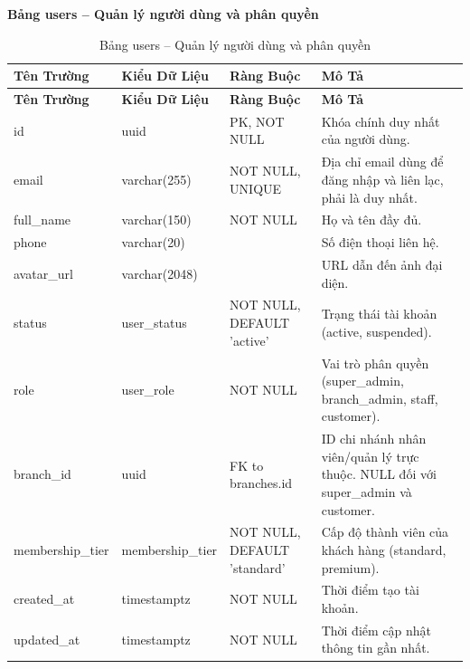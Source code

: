 \textbf{Bảng users -- Quản lý người dùng và phân quyền}
\label{table:users}
\begin{longtable}{|p{3cm}|p{2.5cm}|p{3.5cm}|p{5cm}|}
\caption{Bảng users -- Quản lý người dùng và phân quyền} \\
\hline
\textbf{Tên Trường} & \textbf{Kiểu Dữ Liệu} & \textbf{Ràng Buộc} & \textbf{Mô Tả} \\
\hline
\endfirsthead
\hline
\textbf{Tên Trường} & \textbf{Kiểu Dữ Liệu} & \textbf{Ràng Buộc} & \textbf{Mô Tả} \\
\hline
\endhead
id & uuid & PK, NOT NULL & Khóa chính duy nhất của người dùng. \\
\hline
email & varchar(255) & NOT NULL, UNIQUE & Địa chỉ email dùng để đăng nhập và liên lạc, phải là duy nhất. \\
\hline
full\_name & varchar(150) & NOT NULL & Họ và tên đầy đủ. \\
\hline
phone & varchar(20) & & Số điện thoại liên hệ. \\
\hline
avatar\_url & varchar(2048) & & URL dẫn đến ảnh đại diện. \\
\hline
status & user\_status & NOT NULL, DEFAULT 'active' & Trạng thái tài khoản (active, suspended). \\
\hline
role & user\_role & NOT NULL & Vai trò phân quyền (super\_admin, branch\_admin, staff, customer). \\
\hline
branch\_id & uuid & FK to branches.id & ID chi nhánh nhân viên/quản lý trực thuộc. NULL đối với super\_admin và customer. \\
\hline
membership\_tier & membership\_tier & NOT NULL, DEFAULT 'standard' & Cấp độ thành viên của khách hàng (standard, premium). \\
\hline
created\_at & timestamptz & NOT NULL & Thời điểm tạo tài khoản. \\
\hline
updated\_at & timestamptz & NOT NULL & Thời điểm cập nhật thông tin gần nhất. \\
\hline
\end{longtable}

